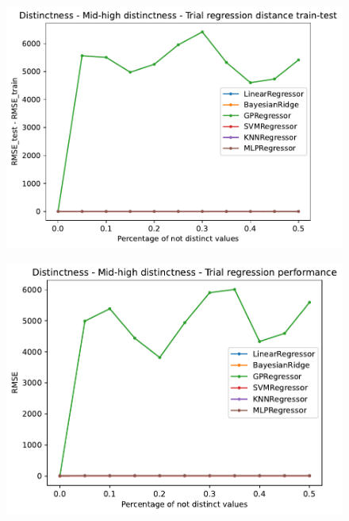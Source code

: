 \documentclass{Configuration_Files/PoliMi3i_thesis}
\begin{document}
\newpage
\begin{figure}
    \centering
    \includegraphics[scale=0.6]{Images/distinctness/dex1/Distinctness - Mid-high distinctness - Trial regression distance train-test.pdf}
\end{figure}
\begin{figure}
    \centering
    \includegraphics[scale=0.6]{Images/distinctness/dex1/Distinctness - Mid-high distinctness - Trial regression performance.pdf}
\end{figure}
\end{document}
